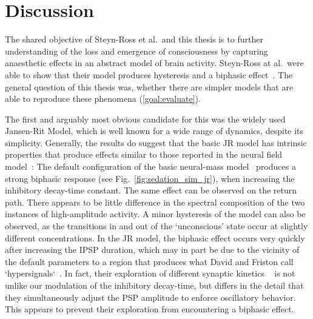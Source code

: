 \chapter{Discussion}

The shared objective of Steyn-Ross et al.\ and this thesis
is to further understanding of the loss and emergence of consciousness
by capturing anaesthetic effects in an abstract model of brain activity.
Steyn-Ross at al.\ were able to show
that their model produces hysteresis and a biphasic effect~\cite{hutt_progress_2011}.
The general question of this thesis was,
whether there are simpler models
that are able to reproduce these phenomena (\ref{goal:evaluate}).

The first and arguably most obvious candidate for this was the widely used Jansen-Rit Model,
which is well known for a wide range of dynamics, despite its simplicity.
Generally, the results do suggest that the basic JR model has intrinsic properties that produce
effects similar to those reported in the neural field model~\cite{hutt_progress_2011}:
The default configuration of the basic neural-mass model~\cite{jansen_electroencephalogram_1995}
produces a strong biphasic response (see Fig.~\ref{fig:sedation_sim_jr}),
when increasing the inhibitory decay-time constant.
The same effect can be observed on the return path.
There appears to be little difference in the spectral composition of the two instances of high-amplitude activity.
A minor hysteresis of the model can also be observed, as the transitions in and out of the `unconscious' state
occur at slightly different concentrations.
In the JR model, the biphasic effect occurs very quickly after increasing the IPSP duration, which may in part be due
to the vicinity of the default parameters to a region that produces what David and Friston call
`hypersignals`~\cite{david_neural_2003}.
In fact, their exploration of different synaptic kinetics ~\cite[Fig. 4]{david_neural_2003}
is not unlike our modulation of the inhibitory decay-time,
but differs in the detail that they simultaneously adjust the PSP amplitude to enforce oscillatory behavior.
This appears to prevent their exploration from encountering a biphasic effect.

